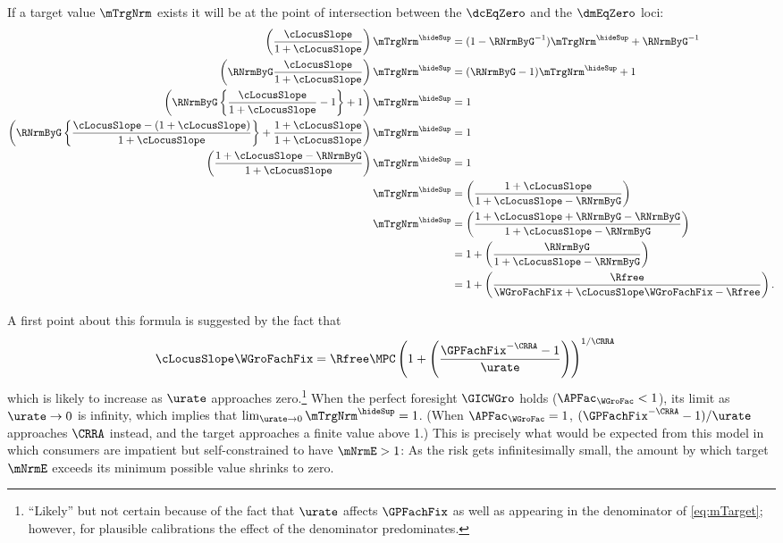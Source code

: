 \documentclass{econark}
\begin{document}
If a target value $\mTrgNrm$ exists it will be at the point of intersection between the $\dcEqZero$ and the $\dmEqZero$ loci:
\begin{equation}\begin{gathered}\begin{aligned}
  \left(\frac{\cLocusSlope}{1+\cLocusSlope}\right)\mTrgNrm^{\hideSup} & =  (1-\RNrmByG^{-1})\mTrgNrm^{\hideSup}+\RNrmByG^{-1}
\\  \left(\RNrmByG\frac{\cLocusSlope}{1+\cLocusSlope}\right)\mTrgNrm^{\hideSup} & =  (\RNrmByG-1)\mTrgNrm^{\hideSup}+1
\\  \left(\RNrmByG\left\{\frac{\cLocusSlope}{1+\cLocusSlope}-1\right\}+1\right)\mTrgNrm^{\hideSup} & =  1
\\  \left(\RNrmByG\left\{\frac{\cLocusSlope-(1+\cLocusSlope)}{1+\cLocusSlope}\right\}+\frac{1+\cLocusSlope}{1+\cLocusSlope}\right)\mTrgNrm^{\hideSup} & =  1
\\  \left(\frac{1+\cLocusSlope-\RNrmByG}{1+\cLocusSlope}\right)\mTrgNrm^{\hideSup} & =  1
\\  \mTrgNrm^{\hideSup} & =  \left(\frac{1+\cLocusSlope}{1+\cLocusSlope-\RNrmByG}\right)
\\  \mTrgNrm^{\hideSup} & =  \left(\frac{1+\cLocusSlope+\RNrmByG-\RNrmByG}{1+\cLocusSlope-\RNrmByG}\right)
\\ & =  1 + \left(\frac{\RNrmByG}{1+\cLocusSlope-\RNrmByG}\right)
\\ & =  1 + \left(\frac{\Rfree}{\WGroFachFix+\cLocusSlope\WGroFachFix-\Rfree}\right)  \label{eq:mTarget}
.
\end{aligned}\end{gathered}\end{equation}

A first point about this formula is suggested by the fact that
\begin{equation}\begin{gathered}\begin{aligned}
  \cLocusSlope\WGroFachFix & =  \Rfree \MPC \left(1+\left(\frac{\GPFachFix^{-\CRRA} - 1}{\urate}\right)\right)^{1/\CRRA}
\end{aligned}\end{gathered}\end{equation}
which is likely to increase as $\urate$ approaches zero.\footnote{``Likely'' but not certain because of the fact that $\urate$ affects $\GPFachFix$ as well as
  appearing in the denominator of \eqref{eq:mTarget}; however, for
  plausible calibrations the effect of the denominator predominates.}
When the perfect foresight $\GICWGro$ holds ($\APFac_{\WGroFac} < 1$), its limit as $\urate \rightarrow 0$ is infinity, which
implies that $\lim_{\urate \rightarrow 0} \mTrgNrm^{\hideSup} = 1$.  (When $\APFac_{\WGroFac} = 1$, $(\GPFachFix^{-\CRRA}-1)/\urate$ approaches $\CRRA$ instead, and the target approaches a finite value above 1.)  This is precisely what would be expected from
this model in which consumers are impatient but self-constrained to
have $\mNrmE > 1$:  As the risk gets infinitesimally small, the
amount by which target $\mNrmE$ exceeds its minimum possible value shrinks to
zero.
\end{document}
